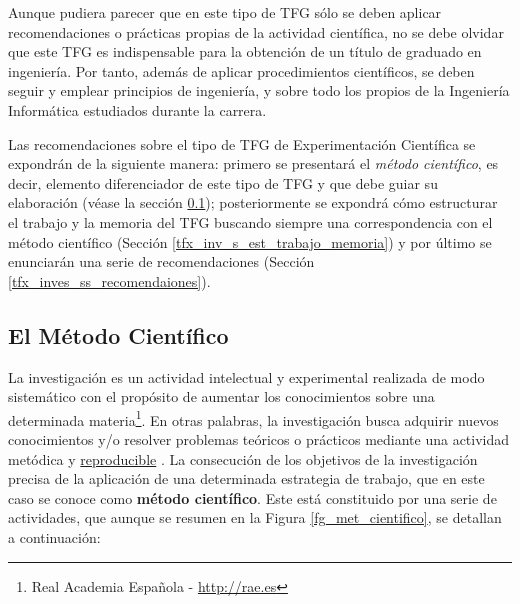 Aunque pudiera parecer que en este tipo de TFG sólo se deben aplicar recomendaciones o prácticas propias de la actividad científica, no se debe olvidar que este TFG es indispensable para la obtención de un título de graduado en ingeniería. Por tanto, además de aplicar procedimientos científicos, se deben seguir y emplear principios de ingeniería, y sobre todo los propios de la Ingeniería Informática estudiados durante la carrera.

Las recomendaciones sobre el tipo de TFG de Experimentación Científica se expondrán de la siguiente manera: primero se presentará el \textit{método científico}, es decir, elemento diferenciador de este tipo de TFG y que debe guiar su elaboración (véase la sección \ref{tfx_inv_s_met_cientifico}); posteriormente se expondrá cómo estructurar el trabajo y la memoria del TFG buscando siempre una correspondencia con el método científico (Sección  \ref{tfx_inv_s_est_trabajo_memoria}) y por último se enunciarán una serie de recomendaciones (Sección \ref{tfx_inves_ss_recomendaiones}).

\subsection{El Método Científico}\label{tfx_inv_s_met_cientifico}

La investigación es un actividad intelectual y experimental realizada de modo sistemático con el propósito de aumentar los conocimientos sobre una determinada materia\footnote{Real Academia Española - \url{http://rae.es}}. En otras palabras, la investigación busca adquirir nuevos conocimientos y/o resolver problemas teóricos o prácticos mediante una actividad metódica y \underline {reproducible} \cite{NationalAcademies2019}. La consecución de los objetivos de la investigación precisa de la aplicación de una determinada estrategia de trabajo, que en este caso se conoce como \textbf{método científico}. Este está constituido por una serie de actividades, que aunque se resumen en la Figura \ref{fg_met_cientifico}, se detallan a continuación:


